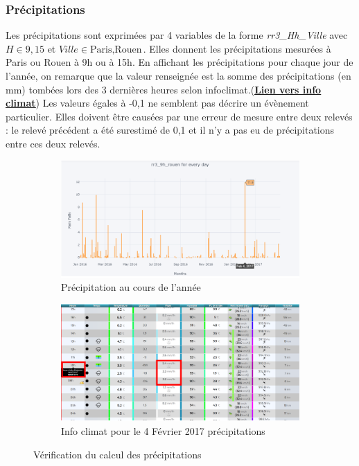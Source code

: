 \documentclass{article} %
\begin{document}
\subsubsection{Précipitations}
Les précipitations sont exprimées par 4 variables de la forme \textit{rr3\_Hh\_Ville} avec$ H \in {9,15}$ et $Ville \in {\mbox{Paris},\mbox{Rouen}}$. Elles donnent les précipitations mesurées à Paris ou Rouen à 9h ou à 15h.
En affichant les précipitations pour chaque jour de l’année, on remarque que la valeur renseignée est la somme des précipitations (en mm) tombées lors des 3 dernières heures selon infoclimat.(\href{https://www.infoclimat.fr/climatologie/annee/2016/rouen-boos/valeurs/07037.html}{\underline{\textbf{\textcolor[rgb]{0,0,1}{Lien vers info climat}}}}) 
Les valeurs égales à -0,1 ne semblent pas décrire un évènement particulier. Elles doivent être causées par une erreur de mesure entre deux relevés : le relevé précédent a été surestimé de 0,1 et il n’y a pas eu de précipitations entre ces deux relevés.
\begin{figure}[!h]
	\centering
	\begin{subfigure}{0.5\textwidth}
		\centering
		\includegraphics[keepaspectratio = true,scale=0.45]{precip.png}
		\caption{Précipitation au cours de l'année}
		\label{fig:precip}
	\end{subfigure}%
	\begin{subfigure}{0.5\textwidth}
		\centering
		\includegraphics[keepaspectratio = true,scale=0.45]{precip2.png}
		\caption{Info climat pour le 4 Février 2017 précipitations}
		\label{fig:precip2}
	\end{subfigure}
	\caption{Vérification du calcul des précipitations}
\end{figure}
\newpage
\end{document}
